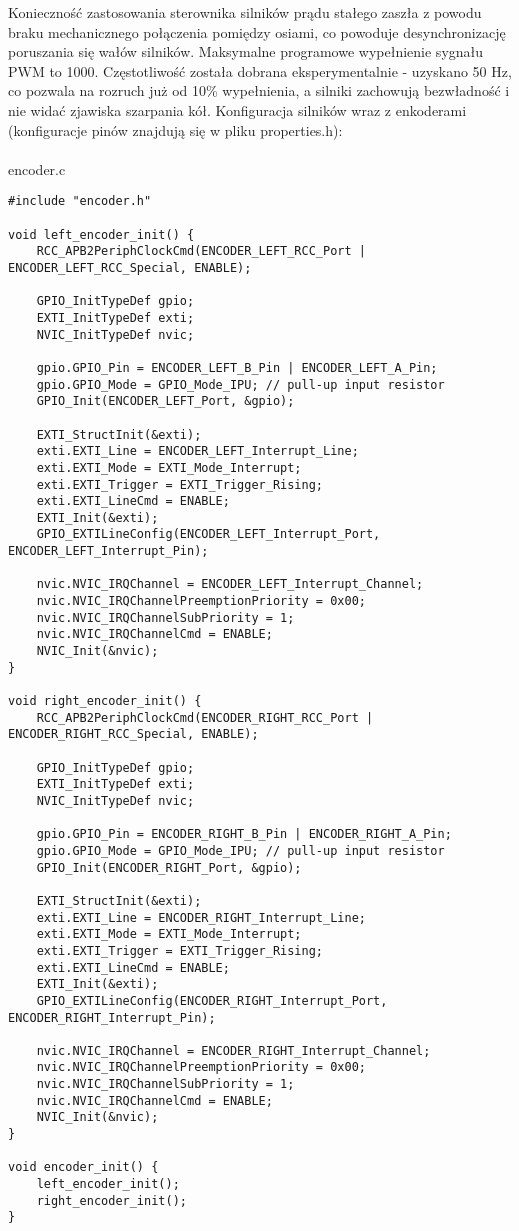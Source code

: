 \documentclass[a4paper,12pt,twoside,openany]{report}
\begin{document}
Konieczność zastosowania sterownika silników prądu stałego zaszła z powodu braku mechanicznego połączenia pomiędzy osiami, co powoduje desynchronizację poruszania się wałów silników. Maksymalne programowe wypełnienie sygnału PWM to 1000. Częstotliwość została dobrana eksperymentalnie - uzyskano 50 Hz, co pozwala na rozruch już od 10\% wypełnienia, a silniki zachowują bezwładność i nie widać zjawiska szarpania kół. Konfiguracja silników wraz z enkoderami (konfiguracje pinów znajdują się w pliku properties.h):\\
\\
encoder.c
\begin{lstlisting}[style=customc]
#include "encoder.h"

void left_encoder_init() {
	RCC_APB2PeriphClockCmd(ENCODER_LEFT_RCC_Port | ENCODER_LEFT_RCC_Special, ENABLE);
	
	GPIO_InitTypeDef gpio;
	EXTI_InitTypeDef exti;
	NVIC_InitTypeDef nvic;

	gpio.GPIO_Pin = ENCODER_LEFT_B_Pin | ENCODER_LEFT_A_Pin;
	gpio.GPIO_Mode = GPIO_Mode_IPU; // pull-up input resistor
	GPIO_Init(ENCODER_LEFT_Port, &gpio);

	EXTI_StructInit(&exti);
	exti.EXTI_Line = ENCODER_LEFT_Interrupt_Line;
	exti.EXTI_Mode = EXTI_Mode_Interrupt;
	exti.EXTI_Trigger = EXTI_Trigger_Rising;
	exti.EXTI_LineCmd = ENABLE;
	EXTI_Init(&exti);
	GPIO_EXTILineConfig(ENCODER_LEFT_Interrupt_Port, ENCODER_LEFT_Interrupt_Pin);
	
	nvic.NVIC_IRQChannel = ENCODER_LEFT_Interrupt_Channel;
	nvic.NVIC_IRQChannelPreemptionPriority = 0x00;
	nvic.NVIC_IRQChannelSubPriority = 1;
	nvic.NVIC_IRQChannelCmd = ENABLE;
	NVIC_Init(&nvic);
}

void right_encoder_init() {
	RCC_APB2PeriphClockCmd(ENCODER_RIGHT_RCC_Port | ENCODER_RIGHT_RCC_Special, ENABLE);
	
	GPIO_InitTypeDef gpio;
	EXTI_InitTypeDef exti;
	NVIC_InitTypeDef nvic;

	gpio.GPIO_Pin = ENCODER_RIGHT_B_Pin | ENCODER_RIGHT_A_Pin;
	gpio.GPIO_Mode = GPIO_Mode_IPU; // pull-up input resistor
	GPIO_Init(ENCODER_RIGHT_Port, &gpio);

	EXTI_StructInit(&exti);
	exti.EXTI_Line = ENCODER_RIGHT_Interrupt_Line;
	exti.EXTI_Mode = EXTI_Mode_Interrupt;
	exti.EXTI_Trigger = EXTI_Trigger_Rising;
	exti.EXTI_LineCmd = ENABLE;
	EXTI_Init(&exti);
	GPIO_EXTILineConfig(ENCODER_RIGHT_Interrupt_Port, ENCODER_RIGHT_Interrupt_Pin);

	nvic.NVIC_IRQChannel = ENCODER_RIGHT_Interrupt_Channel;
	nvic.NVIC_IRQChannelPreemptionPriority = 0x00;
	nvic.NVIC_IRQChannelSubPriority = 1;
	nvic.NVIC_IRQChannelCmd = ENABLE;
	NVIC_Init(&nvic);
}

void encoder_init() {
	left_encoder_init();
	right_encoder_init();
}
\end{lstlisting}
\end{document}
